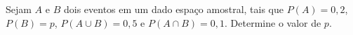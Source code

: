 %
%


\begin{exercicioBanco}[\valorquestao]
Sejam \(A\) e \(B\) dois eventos em um dado espaço amostral, tais que \(P(A) = 0,2\), \(P(B) = p\), \(P(A \cup B) = 0,5\) e \(P(A \cap B) = 0,1\). Determine o valor de \(p\).
\end{exercicioBanco}

